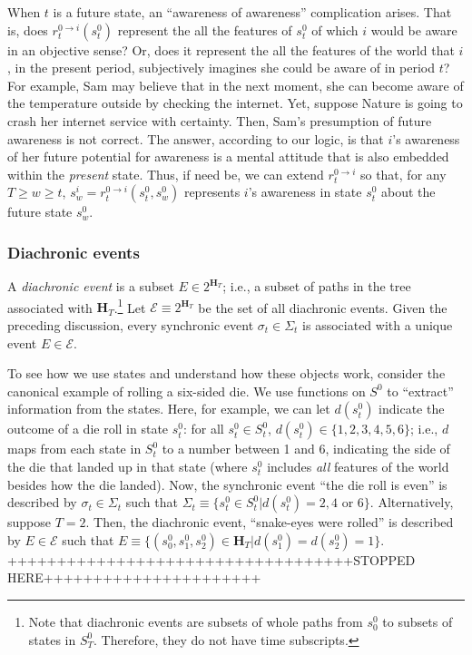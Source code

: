 \documentclass[
11pt,
titlepage,
reqno,
]{article}%
\theoremstyle{definition}
\begin{document}
	 

	 



When $t$ is a future state, an ``awareness of awareness'' complication arises.
That is, does $r^{0\rightarrow i}_t(s^0_t)$ represent the all the features of $s^0_t$ of which $i$  would be aware in an objective sense?
Or, does it represent the all the features of the world that $i$, in the present period, subjectively imagines she  could be aware of in period $t$?
For example, Sam may believe that in the next moment, she can become aware of the temperature outside by checking the internet. 
Yet, suppose Nature is going to crash her internet service with certainty.
Then, Sam's presumption of future awareness is not correct. 
The answer, according to our logic, is that $i$'s awareness of her future potential for awareness is a mental attitude that is also embedded within the \textit{present} state.
Thus, if need be, we can extend $r^{0\rightarrow i}_t$ so that, for any $T\ge w\ge t$, $s^i_w=r^{0\rightarrow i}_t(s^0_t,s^0_w)$ represents $i$'s awareness in state $s^0_t$ about the future state $s^0_w$.

\subsubsection{Diachronic events}


	
	A \textit{diachronic event} is a subset $E\in 2^{\mathbf{H}_T}$; i.e., a subset of paths in the tree associated with $\mathbf{H}_T$.\footnote
	{
		Note that diachronic events are subsets of whole paths from $s^0_0$ to subsets of states in $S^0_T$. 
		Therefore, they do not have time subscripts.
	}
	Let $\mathcal{E}\equiv 2^{\mathbf{H}_T}$ be the set of all diachronic events.
	Given the preceding discussion, every synchronic event $\sigma_t\in\Sigma_t$ is associated with a unique event $E\in \mathcal{E}$. 

	
	To see how we use states and understand how these objects work, consider the canonical example of rolling a six-sided die. 
	We use functions on $S^0$ to ``extract'' information from the states. 
	Here, for example, we can let $d(s^0_t)$ indicate the outcome of a die roll in state $s^0_t$: for all $s^0_t\in S^0_t$, $d(s^0_t)\in\{1,2,3,4,5,6\}$; i.e., $d$ maps from each state in $S^0_t$ to a number between 1 and 6, indicating the side of the die that landed up in that state (where $s^0_t$ includes \textit{all} features of the world besides how the die landed).
	Now, the synchronic event ``the die roll is even'' is described by $\sigma_t\in\Sigma_t$ such that $\Sigma_t\equiv\{s^0_t\in S^0_t|d(s^0_t)=2,4\text{ or }6\}$. 
	Alternatively, suppose $T=2$.
	Then, the diachronic event, ``snake-eyes were rolled'' is described by $E\in\mathcal{E}$ such that $E\equiv\{(s^0_0,s^0_1,s^0_2)\in \mathbf{H}_T|d(s^0_1)=d(s^0_2)=1\}$.
	 +++++++++++++++++++++++++++++++++++STOPPED HERE++++++++++++++++++++++
	
\end{document}
